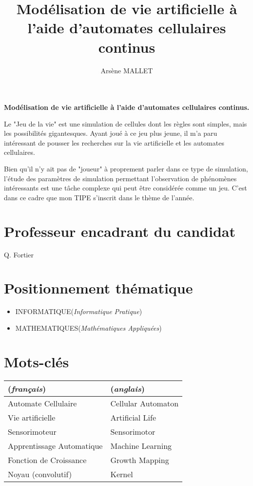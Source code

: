 \documentclass[a4paper, 11pt]{article}
\author{Arsène MALLET}
\title{Modélisation de vie artificielle à l'aide d'automates cellulaires continus}
\begin{document}
    
\begin{center}
{\textbf {Modélisation de vie artificielle à l'aide d'automates cellulaires continus.}}
\end{center}

Le "Jeu de la vie" est une simulation de cellules dont les règles sont simples, mais 
les possibilités gigantesques. Ayant joué à ce jeu plus jeune, il m'a paru intéressant
de pousser les recherches sur la vie artificielle et les automates cellulaires.

Bien qu'il n'y ait pas de "joueur" à proprement parler dans ce type de simulation,
l'étude des paramètres de simulation permettant l'observation de phénomènes intéressants
est une tâche complexe qui peut être considérée comme un jeu. C'est dans ce cadre que 
mon TIPE s'inscrit dans le thème de l'année.

\vspace{5mm}

\section*{Professeur encadrant du candidat}
Q. Fortier

\section*{Positionnement th\'ematique}
\begin{itemize}
    \item INFORMATIQUE(\textit{Informatique Pratique})
    \item MATHEMATIQUES(\textit{Math\'ematiques Appliqu\'ees})
\end{itemize}

\section*{Mots-cl\'es}

\begin{tabular}{l l} 
    (\textit{français}) & (\textit{anglais}) \\ \hline
    Automate Cellulaire & Cellular Automaton \\
    Vie artificielle & Artificial Life \\
    Sensorimoteur & Sensorimotor \\
    Apprentissage Automatique & Machine Learning \\
    Fonction de Croissance & Growth Mapping \\
    Noyau (convolutif) & Kernel \\ \hline
    \end{tabular}
\end{document}
